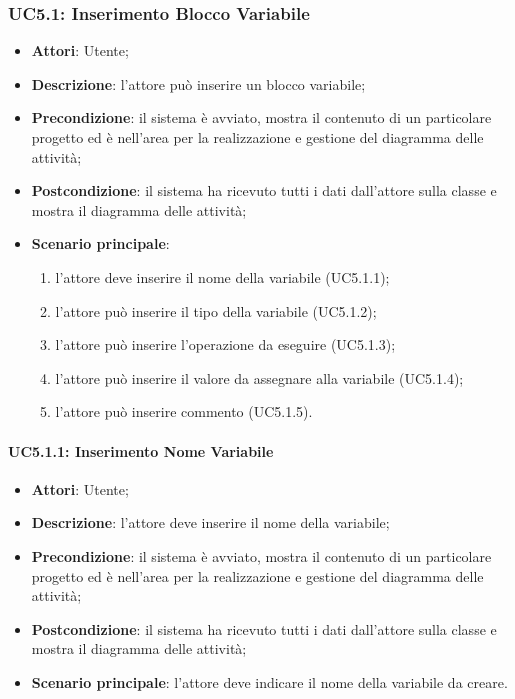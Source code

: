 \subsubsection{UC5.1: Inserimento Blocco Variabile}
\label{UC5.1}
\begin{itemize}
	\item \textbf{Attori}: Utente;
	\item \textbf{Descrizione}: l'attore può inserire un blocco variabile;
	\item \textbf{Precondizione}: il sistema è avviato, mostra il contenuto di un particolare progetto ed è nell'area per la realizzazione e gestione del diagramma delle attività;
	\item \textbf{Postcondizione}: il sistema ha ricevuto tutti i dati dall'attore sulla classe e mostra il diagramma delle attività;
	\item \textbf{Scenario principale}:
	\begin{enumerate}
		\item l'attore deve inserire il nome della variabile (UC5.1.1);
		\item l'attore può inserire il tipo della variabile (UC5.1.2);
		\item l'attore può inserire l'operazione da eseguire (UC5.1.3);
		\item l'attore può inserire il valore da assegnare alla variabile (UC5.1.4);
		\item l'attore può inserire commento (UC5.1.5).
	\end{enumerate}
\end{itemize}

\paragraph{UC5.1.1: Inserimento Nome Variabile}
\label{UC5.1.1}
\begin{itemize}
	\item \textbf{Attori}: Utente;
	\item \textbf{Descrizione}: l'attore deve inserire il nome della variabile;
	\item \textbf{Precondizione}: il sistema è avviato, mostra il contenuto di un particolare progetto ed è nell'area per la realizzazione e gestione del diagramma delle attività;
	\item \textbf{Postcondizione}: il sistema ha ricevuto tutti i dati dall'attore sulla classe e mostra il diagramma delle attività;
	\item \textbf{Scenario principale}: l'attore deve indicare il nome della variabile da creare.
\end{itemize}

